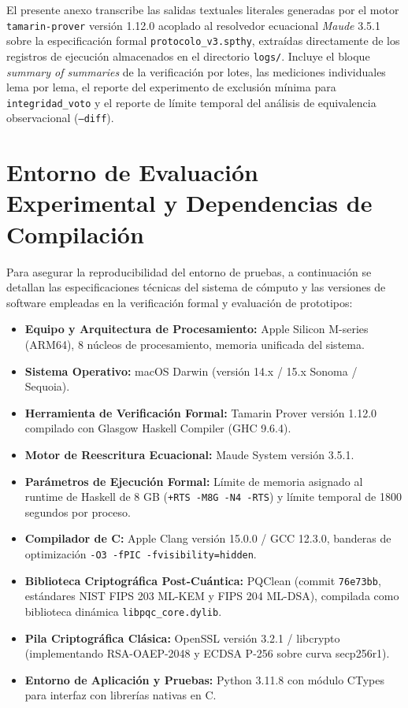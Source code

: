 El presente anexo transcribe las salidas textuales literales generadas por el motor \texttt{tamarin-prover} versión 1.12.0 acoplado al resolvedor ecuacional \textit{Maude} 3.5.1 sobre la especificación formal \texttt{protocolo\_v3.spthy}, extraídas directamente de los registros de ejecución almacenados en el directorio \texttt{logs/}. Incluye el bloque \textit{summary of summaries} de la verificación por lotes, las mediciones individuales lema por lema, el reporte del experimento de exclusión mínima para \texttt{integridad\_voto} y el reporte de límite temporal del análisis de equivalencia observacional (\texttt{--diff}).

\begin{scriptsize}

\end{scriptsize}

\clearpage

\chapter{Entorno de Evaluación Experimental y Dependencias de Compilación}
\label{anexo:entorno_benchmark}

Para asegurar la reproducibilidad del entorno de pruebas, a continuación se detallan las especificaciones técnicas del sistema de cómputo y las versiones de software empleadas en la verificación formal y evaluación de prototipos:

\begin{itemize}
    \item \textbf{Equipo y Arquitectura de Procesamiento:} Apple Silicon M-series (ARM64), 8 núcleos de procesamiento, memoria unificada del sistema.
    \item \textbf{Sistema Operativo:} macOS Darwin (versión 14.x / 15.x Sonoma / Sequoia).
    \item \textbf{Herramienta de Verificación Formal:} Tamarin Prover versión 1.12.0 compilado con Glasgow Haskell Compiler (GHC 9.6.4).
    \item \textbf{Motor de Reescritura Ecuacional:} Maude System versión 3.5.1.
    \item \textbf{Parámetros de Ejecución Formal:} Límite de memoria asignado al runtime de Haskell de 8 GB (\texttt{+RTS -M8G -N4 -RTS}) y límite temporal de 1800 segundos por proceso.
    \item \textbf{Compilador de C:} Apple Clang versión 15.0.0 / GCC 12.3.0, banderas de optimización \texttt{-O3 -fPIC -fvisibility=hidden}.
    \item \textbf{Biblioteca Criptográfica Post-Cuántica:} PQClean (commit \texttt{76e73bb}, estándares NIST FIPS 203 ML-KEM y FIPS 204 ML-DSA), compilada como biblioteca dinámica \texttt{libpqc\_core.dylib}.
    \item \textbf{Pila Criptográfica Clásica:} OpenSSL versión 3.2.1 / libcrypto (implementando RSA-OAEP-2048 y ECDSA P-256 sobre curva secp256r1).
    \item \textbf{Entorno de Aplicación y Pruebas:} Python 3.11.8 con módulo CTypes para interfaz con librerías nativas en C.
\end{itemize}
